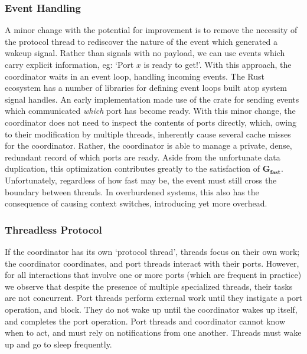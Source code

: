 \subsubsection{Event Handling}
A minor change with the potential for improvement is to remove the necessity of the protocol thread to rediscover the nature of the event which generated a wakeup signal. Rather than signals with no payload, we can use events which carry explicit information, eg: `Port $x$ is ready to get!'. With this approach, the coordinator waits in an event loop, handling incoming events. The Rust ecosystem has a number of libraries for defining event loops built atop system signal handles. An early implementation made use of the  crate for sending events which communicated \textit{which} port has become ready. With this minor change, the coordinator does not need to inspect the contents of ports directly, which, owing to their modification by multiple threads, inherently cause several cache misses for the coordinator. Rather, the coordinator is able to manage a private, dense, redundant record of which ports are ready. Aside from the unfortunate data duplication, this optimization contributes greatly to the satisfaction of $\boldsymbol{G_{fast}}$. Unfortunately, regardless of how fast  may be, the event must still cross the boundary between threads. In overburdened systems, this also has the consequence of causing context switches, introducing yet more overhead.

\subsubsection{Threadless Protocol}
If the coordinator has its own `protocol thread', threads focus on their own work; the coordinator coordinates, and port threads interact with their ports. However, for all interactions that involve one or more ports (which are frequent in practice) we observe that despite the presence of multiple specialized threads, their tasks are not concurrent. Port threads perform external work until they instigate a port operation, and block. They do not wake up until the coordinator wakes up itself, and completes the port operation. Port threads and coordinator cannot know when to act, and must rely on notifications from one another. Threads must wake up and go to sleep frequently. 

